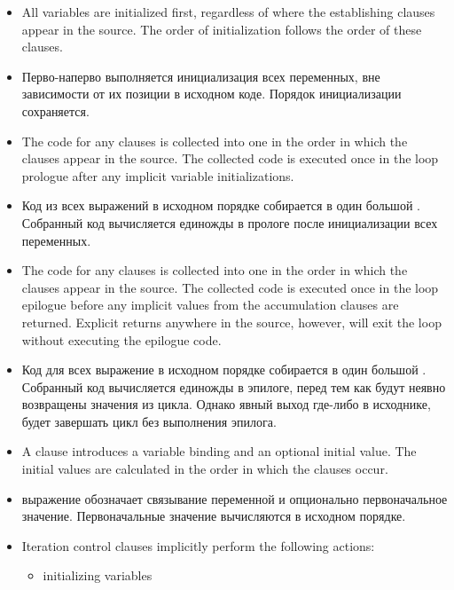 \begin{itemize}

\item All variables are initialized first, regardless of where the
  establishing clauses appear in the source.  The order of
  initialization follows the order of these clauses.

\item Перво-наперво выполняется инициализация всех переменных, вне
  зависимости от их позиции в исходном коде.
  Порядок инициализации сохраняется.

\item The code for any  clauses is collected into one
   in the order in which the clauses appear in the source.
  The collected code is executed once in the loop prologue after any
  implicit variable initializations.

\item Код из всех  выражений в исходном порядке
  собирается в один большой . Собранный код вычисляется
  единожды в прологе после инициализации всех переменных.

\item The code for any  clauses is collected into one
   in the order in which the clauses appear in the source.
  The collected code is executed once in the loop epilogue before any
  implicit values from the accumulation clauses are returned.
  Explicit returns anywhere in the source, however, will exit the loop
  without executing the epilogue code.

\item Код для всех  выражение в исходном порядке
  собирается в один большой . Собранный код вычисляется
  единожды в эпилоге, перед тем как будут неявно возвращены значения
  из цикла. Однако явный выход где-либо в исходнике, будет завершать
  цикл без выполнения эпилога.

\item A  clause introduces a variable binding and an
  optional initial value.  The initial values are calculated in the
  order in which the  clauses occur.

\item {} выражение обозначает связывание переменной и
  опционально первоначальное значение. Первоначальные значение
  вычисляются в исходном порядке.

\item Iteration control clauses implicitly perform the following
  actions:
  \begin{itemize}
  \item initializing variables


\end{itemize}
\end{itemize}
